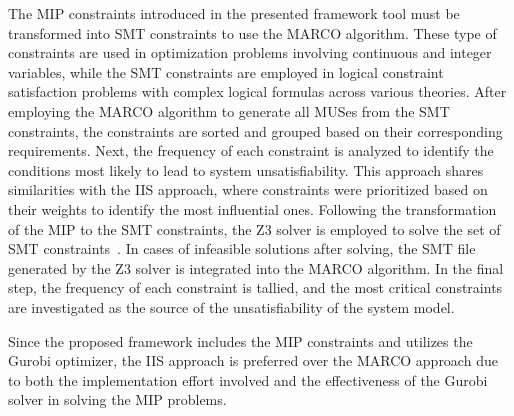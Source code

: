     
 
    
    The MIP constraints introduced in the presented framework tool must be transformed into SMT constraints to use the MARCO algorithm. These type of constraints are used in optimization problems involving continuous and integer variables, while the SMT constraints are employed in logical constraint satisfaction problems with complex logical formulas across various theories.
    After employing the MARCO algorithm to generate all MUSes from the SMT constraints, the constraints are sorted and grouped based on their corresponding requirements.
    Next, the frequency of each constraint is analyzed to identify the conditions most likely to lead to system unsatisfiability. This approach shares similarities with the IIS approach, where constraints were prioritized based on their weights to identify the most influential ones. Following the transformation of the MIP to the SMT constraints, the Z3 solver is employed to solve the set of SMT constraints~\cite{de2008z3}. In cases of infeasible solutions after solving, the SMT file generated by the Z3 solver is integrated into the MARCO algorithm. In the final step, the frequency of each constraint is tallied, and the most critical constraints are investigated as the source of the unsatisfiability of the system model.
    
    Since the proposed framework includes the MIP constraints and utilizes the Gurobi optimizer, the IIS approach is preferred over the MARCO approach due to both the implementation effort involved and the effectiveness of the Gurobi solver in solving the MIP problems.
    
    
    
    
    
